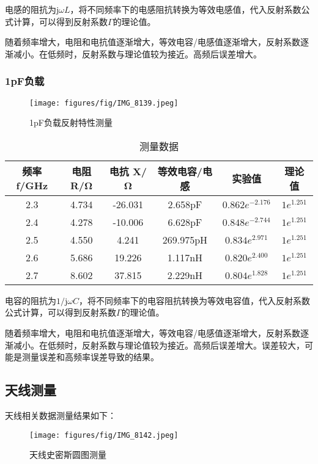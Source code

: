 \documentclass[12pt,hyperref,a4paper,UTF8]{ctexart}
\begin{document}
电感的阻抗为$\mathrm{j}\omega L$，将不同频率下的电感阻抗转换为等效电感值，代入反射系数公式计算，可以得到反射系数$\Gamma$的理论值。

随着频率增大，电阻和电抗值逐渐增大，等效电容/电感值逐渐增大，反射系数逐渐减小。在低频时，反射系数与理论值较为接近。高频后误差增大。

\subsubsection{1pF负载}
        \begin{figure}[H]
            \centering
            \texttt{[image: figures/fig/IMG\_8139.jpeg]}
            \caption{1pF负载反射特性测量}
            \label{fig:enter-label}
        \end{figure}
        
        \begin{table}[h]
            \centering
            \begin{tabular}{cccccc}
            \hline
            频率 f/GHz & 电阻 R/Ω & 电抗 X/Ω & 等效电容/电感 & 实验值 & 理论值 \\
            \hline
            2.3 & 4.734 & -26.031 & 2.658pF & $0.862e^{-2.176}$ & $1e^{1.251}$ \\
            2.4 & 4.278 & -10.006 & 6.628pF & $0.848e^{-2.744}$ & $1e^{1.251}$ \\
            2.5 & 4.550 & 4.241 & 269.975pH & $0.834e^{2.971}$ & $1e^{1.251}$ \\
            2.6 & 5.686 & 19.226 & 1.117nH & $0.820e^{2.400}$ & $1e^{1.251}$ \\
            2.7 & 8.602 & 37.815 & 2.229nH & $0.804e^{1.828}$ & $1e^{1.251}$ \\
            \hline
            \end{tabular}
            \caption{测量数据}
            \label{tab:my_label}
            \end{table}

电容的阻抗为$1/\mathrm{j}\omega C$，将不同频率下的电容阻抗转换为等效电容值，代入反射系数公式计算，可以得到反射系数$\Gamma$的理论值。

随着频率增大，电阻和电抗值逐渐增大，等效电容/电感值逐渐增大，反射系数逐渐减小。在低频时，反射系数与理论值较为接近。高频后误差增大。误差较大，可能是测量误差和高频率误差导致的结果。

\subsection{天线测量}
天线相关数据测量结果如下：
\begin{figure}[H]
    \centering
    \texttt{[image: figures/fig/IMG\_8142.jpeg]}
    \caption{天线史密斯圆图测量}
    \label{fig:enter-label}
\end{figure}
\end{document}
